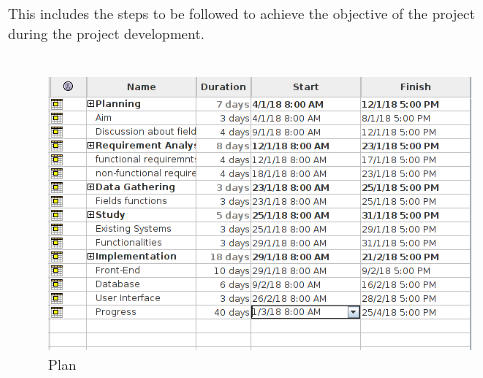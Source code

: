 This includes the steps to be followed to achieve the objective of the project during the project
development.\\\\

 
 \begin{figure}[h!]
\centering \includegraphics[scale=.74]{input/images/chart2.png}
	\caption{Plan}
\end{figure}
\newpage
